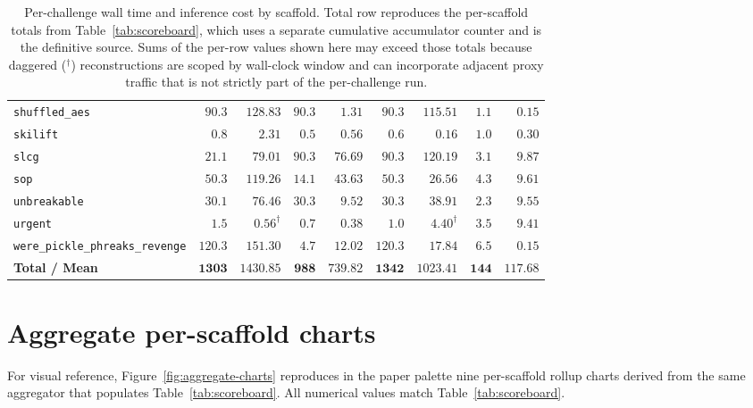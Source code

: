 \begin{table}[t]
\begin{tabular*}{\textwidth}{@{\extracolsep{\fill}}lrrrrrrrr@{}}
\texttt{shuffled\_aes}                  & $90.3$  & $128.83$        & $90.3$  & $1.31$    & $90.3$  & $115.51$         & $1.1$  & $0.15$ \\
\texttt{skilift}                        & $0.8$   & $2.31$          & $0.5$   & $0.56$    & $0.6$   & $0.16$           & $1.0$  & $0.30$ \\
\texttt{slcg}                           & $21.1$  & $79.01$         & $90.3$  & $76.69$   & $90.3$  & $120.19$         & $3.1$  & $9.87$ \\
\texttt{sop}                            & $50.3$  & $119.26$        & $14.1$  & $43.63$   & $50.3$  & $26.56$          & $4.3$  & $9.61$ \\
\texttt{unbreakable}                    & $30.1$  & $76.46$         & $30.3$  & $9.52$    & $30.3$  & $38.91$          & $2.3$  & $9.55$ \\
\texttt{urgent}                         & $1.5$   & $0.56^{\dag}$   & $0.7$   & $0.38$    & $1.0$   & $4.40^{\dag}$    & $3.5$  & $9.41$ \\
\texttt{were\_pickle\_phreaks\_revenge} & $120.3$ & $151.30$  & $4.7$   & $12.02$   & $120.3$ & $17.84$   & $6.5$  & $0.15$ \\
\midrule
\textbf{Total / Mean}                   & $\mathbf{1303}$ & $\mathbf{1430.85}$ & $\mathbf{988}$ & $\mathbf{739.82}$ & $\mathbf{1342}$ & $\mathbf{1023.41}$ & $\mathbf{144}$ & $\mathbf{117.68}$ \\
\bottomrule
\end{tabular*}
\caption{Per-challenge wall time and inference cost by scaffold. Total row reproduces the per-scaffold totals from Table~\ref{tab:scoreboard}, which uses a separate cumulative accumulator counter and is the definitive source. Sums of the per-row values shown here may exceed those totals because daggered ($^{\dag}$) reconstructions are scoped by wall-clock window and can incorporate adjacent proxy traffic that is not strictly part of the per-challenge run.}\label{tab:per-challenge-metrics}
\end{table}

\FloatBarrier
\section{Aggregate per-scaffold charts}\label{app:aggregate}

For visual reference, Figure~\ref{fig:aggregate-charts} reproduces in the paper palette nine per-scaffold rollup charts derived from the same aggregator that populates Table~\ref{tab:scoreboard}. All numerical values match Table~\ref{tab:scoreboard}.


